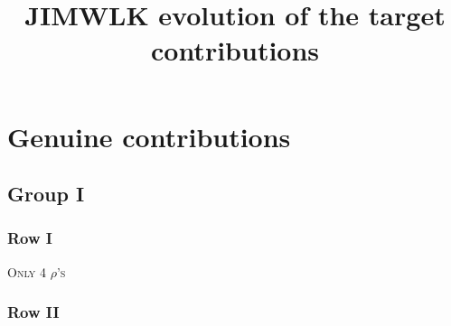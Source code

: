 \documentclass[9pt]{article}
\title{JIMWLK evolution of the target contributions}
\author{}
\date{}
\numberwithin{equation}{section}
\begin{document}
\maketitle
\section{Genuine contributions}
\subsection{Group I}
\subsubsection{Row I}
\textsc{Only 4 $\rho$'s}
\subsubsection{Row II}
\end{document}
